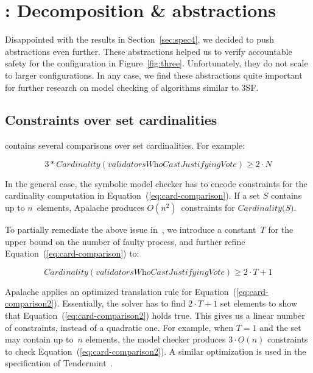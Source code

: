 
\section{\SpecFourB{}: Decomposition \& abstractions}\label{sec:spec4b}

Disappointed with the results in Section~\ref{sec:spec4}, we decided to
push abstractions even further. These abstractions helped us to verify
accountable safety for the configuration in Figure~\ref{fig:three}.
Unfortunately, they do not scale to larger configurations. In any case, we
find these abstractions quite important for further research on model checking
of algorithms similar to 3SF\@.

\subsection{Constraints over set cardinalities}

\SpecThree{} contains several comparisons over set cardinalities. For example:

\begin{equation}
    3 * \textit{Cardinality}(\textit{validatorsWhoCastJustifyingVote}) \ge 2 \cdot N
    \label{eq:card-comparison}
\end{equation}

In the general case, the symbolic model checker has to encode constraints for
the cardinality computation in Equation~(\ref{eq:card-comparison}). If a set
$S$ contains up to $n$~elements, Apalache produces $O(n^2)$~constraints for
$\textit{Cardinality(S)}$.

To partially remediate the above issue in~\SpecFour{}, we introduce a
constant~$T$ for the upper bound on the number of faulty process, and further
refine Equation~(\ref{eq:card-comparison}) to:

\begin{equation}
    \textit{Cardinality}(\textit{validatorsWhoCastJustifyingVote}) \ge 2 \cdot T + 1
    \label{eq:card-comparison2}
\end{equation}

Apalache applies an optimized translation rule for
Equation~(\ref{eq:card-comparison2}). Essentially, the solver has to find $2
\cdot T + 1$ set elements to show that Equation~(\ref{eq:card-comparison2})
holds true. This gives us a linear number of constraints, instead of a
quadratic one. For example, when $T=1$ and the set may contain up to~$n$
elements, the model checker produces $3 \cdot O(n)$ constraints to check
Equation~(\ref{eq:card-comparison2}). A similar optimization is used in the
specification of Tendermint~\cite{TendermintSpec2020}.

